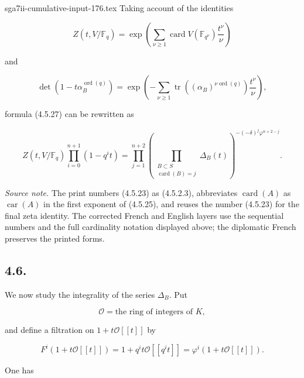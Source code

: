 \begin{filecontents*}{sga7ii-cumulative-input-176.tex}
Taking account of the identities

\begin{equation}\tag{4.5.31}
Z(t,V/\mathbb F_q)
=\exp\!\left(
\sum_{\nu\geq1}
\operatorname{card}V(\mathbb F_{q^\nu})\frac{t^\nu}{\nu}
\right)
\end{equation}

and

\begin{equation}\tag{4.5.32}
\det\!\left(1-t\alpha_B^{\operatorname{ord}(q)}\right)
=\exp\!\left(
-\sum_{\nu\geq1}
\operatorname{tr}\!\left((\alpha_B)^{\nu\operatorname{ord}(q)}\right)
\frac{t^\nu}{\nu}
\right),
\end{equation}

formula (4.5.27) can be rewritten as

\begin{equation}\tag{4.5.33}
Z(t,V/\mathbb F_q)\prod_{i=0}^{n+1}(1-q^it)
=\prod_{j=1}^{n+2}
\left(
\prod_{\substack{B\subset S\\\operatorname{card}(B)=j}}
\Delta_B(t)
\right)^{-(-\delta)^j\varphi^{n+2-j}}.
\end{equation}

\medskip
\noindent\emph{Source note.}
The print numbers (4.5.23) as (4.5.2.3), abbreviates
$\operatorname{card}(A)$ as $\operatorname{car}(A)$ in the first exponent
of (4.5.25), and reuses the number (4.5.23) for the final zeta identity.
The corrected French and English layers use the sequential numbers and the
full cardinality notation displayed above; the diplomatic French preserves
the printed forms.

\subsection*{4.6.}
We now study the integrality of the series $\Delta_B$. Put

\begin{equation}\tag{4.6.1}
\mathcal O=\text{the ring of integers of $K$},
\end{equation}

and define a filtration on $1+t\mathcal O[[t]]$ by

\begin{equation}\tag{4.6.2}
F^i(1+t\mathcal O[[t]])
=1+q^it\mathcal O[[q^it]]
=\varphi^i(1+t\mathcal O[[t]]).
\end{equation}

One has


\end{filecontents*}
